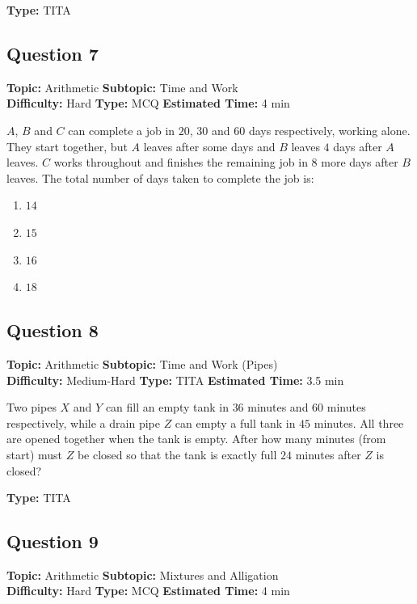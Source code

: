 \documentclass[11pt]{article}
\begin{document}
\textbf{Type:} TITA

\subsection*{Question 7}
\textbf{Topic:} Arithmetic \quad \textbf{Subtopic:} Time and Work \\
\textbf{Difficulty:} Hard \quad \textbf{Type:} MCQ \quad \textbf{Estimated Time:} 4 min

\begin{tcolorbox}
\(A\), \(B\) and \(C\) can complete a job in \(20\), \(30\) and \(60\) days respectively, working alone. They start together, but \(A\) leaves after some days and \(B\) leaves \(4\) days after \(A\) leaves. \(C\) works throughout and finishes the remaining job in \(8\) more days after \(B\) leaves. The total number of days taken to complete the job is:
\end{tcolorbox}

\begin{enumerate}[label=(\Alph*)]
    \item \(14\)
    \item \(15\)
    \item \(16\)
    \item \(18\)
\end{enumerate}

\subsection*{Question 8}
\textbf{Topic:} Arithmetic \quad \textbf{Subtopic:} Time and Work (Pipes) \\
\textbf{Difficulty:} Medium-Hard \quad \textbf{Type:} TITA \quad \textbf{Estimated Time:} 3.5 min

\begin{tcolorbox}
Two pipes \(X\) and \(Y\) can fill an empty tank in \(36\) minutes and \(60\) minutes respectively, while a drain pipe \(Z\) can empty a full tank in \(45\) minutes. All three are opened together when the tank is empty. After how many minutes (from start) must \(Z\) be closed so that the tank is exactly full \(24\) minutes after \(Z\) is closed?
\end{tcolorbox}

\textbf{Type:} TITA

\subsection*{Question 9}
\textbf{Topic:} Arithmetic \quad \textbf{Subtopic:} Mixtures and Alligation \\
\textbf{Difficulty:} Hard \quad \textbf{Type:} MCQ \quad \textbf{Estimated Time:} 4 min
\end{document}
